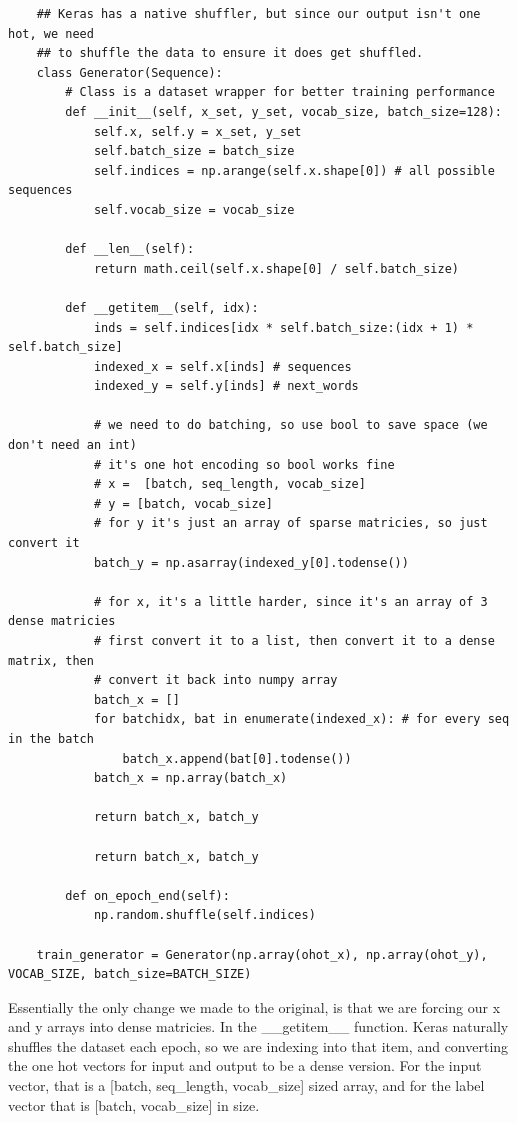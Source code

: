 \documentclass{article}
\begin{document}
\begin{verbatim}
    ## Keras has a native shuffler, but since our output isn't one hot, we need
    ## to shuffle the data to ensure it does get shuffled. 
    class Generator(Sequence):
        # Class is a dataset wrapper for better training performance
        def __init__(self, x_set, y_set, vocab_size, batch_size=128):
            self.x, self.y = x_set, y_set
            self.batch_size = batch_size
            self.indices = np.arange(self.x.shape[0]) # all possible sequences
            self.vocab_size = vocab_size
    
        def __len__(self):
            return math.ceil(self.x.shape[0] / self.batch_size)
    
        def __getitem__(self, idx):
            inds = self.indices[idx * self.batch_size:(idx + 1) * self.batch_size]
            indexed_x = self.x[inds] # sequences
            indexed_y = self.y[inds] # next_words
    
            # we need to do batching, so use bool to save space (we don't need an int)
            # it's one hot encoding so bool works fine
            # x =  [batch, seq_length, vocab_size]
            # y = [batch, vocab_size] 
            # for y it's just an array of sparse matricies, so just convert it
            batch_y = np.asarray(indexed_y[0].todense())
    
            # for x, it's a little harder, since it's an array of 3 dense matricies
            # first convert it to a list, then convert it to a dense matrix, then 
            # convert it back into numpy array
            batch_x = []
            for batchidx, bat in enumerate(indexed_x): # for every seq in the batch
                batch_x.append(bat[0].todense())
            batch_x = np.array(batch_x) 
    
            return batch_x, batch_y
            
            return batch_x, batch_y
        
        def on_epoch_end(self):
            np.random.shuffle(self.indices)
    
    train_generator = Generator(np.array(ohot_x), np.array(ohot_y), VOCAB_SIZE, batch_size=BATCH_SIZE)
\end{verbatim}

Essentially the only change we made to the original, is that we are forcing our x and y arrays into dense matricies. In the \_\_getitem\_\_ function. Keras naturally shuffles the dataset each epoch, so we are indexing into that item, and converting the one hot vectors for input and output to be a dense version. For the input vector, that is a [batch, seq\_length, vocab\_size] sized array, and for the label vector that is [batch, vocab\_size] in size.
\end{document}

